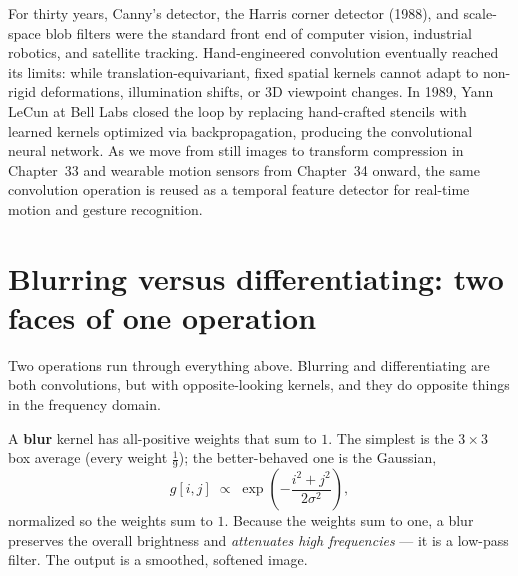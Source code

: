 \begin{historybox}
For thirty years, Canny's detector, the Harris corner detector (1988), and
scale-space blob filters were the standard front end of computer vision, industrial
robotics, and satellite tracking. Hand-engineered convolution eventually reached its
limits: while translation-equivariant, fixed spatial kernels
cannot adapt to non-rigid deformations, illumination shifts, or 3D viewpoint changes.
In 1989, Yann LeCun at Bell Labs closed the loop by replacing hand-crafted stencils
with learned kernels optimized via backpropagation, producing the convolutional
neural network. As we move from still images to transform compression in Chapter~33
and wearable motion sensors from Chapter~34 onward, the same convolution operation
is reused as a temporal feature detector for real-time motion and gesture
recognition.
\end{historybox}

\section{Blurring versus differentiating: two faces of one operation}
\label{ch32:blur-vs-diff}

Two operations run through everything above. Blurring and differentiating are
both convolutions, but with opposite-looking kernels,
and they do opposite things in the frequency domain.

A \textbf{blur} kernel has all-positive weights that sum to $1$. The simplest
is the $3\times3$ box average (every weight $\tfrac19$); the better-behaved one
is the Gaussian,
\begin{equation}
\label{ch32:gauss-kernel}
g[i,j] \;\propto\; \exp\!\left(-\frac{i^2 + j^2}{2\sigma^2}\right),
\end{equation}
normalized so the weights sum to $1$. Because the weights sum to one, a blur
preserves the overall brightness and \emph{attenuates high frequencies} --- it
is a low-pass filter. The output is a smoothed, softened image.

